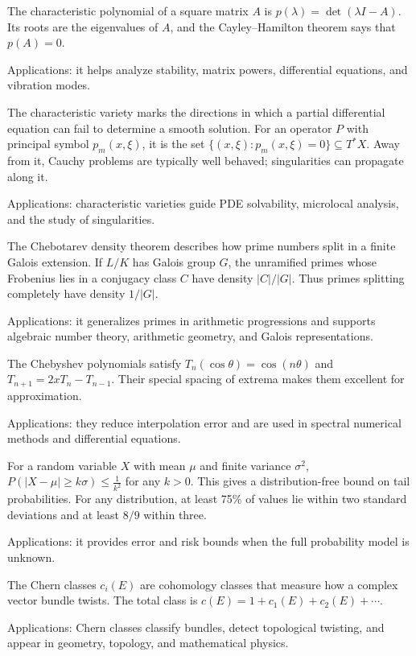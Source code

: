 The characteristic polynomial of a square matrix $A$ is $p(\lambda)=\det(\lambda I-A)$. Its roots are the eigenvalues of $A$, and the Cayley--Hamilton theorem says that $p(A)=0$. \par\noindent Applications: it helps analyze stability, matrix powers, differential equations, and vibration modes.

The characteristic variety marks the directions in which a partial differential equation can fail to determine a smooth solution. For an operator $P$ with principal symbol $p_m(x,\xi)$, it is the set $\{(x,\xi):p_m(x,\xi)=0\}\subseteq T^*X$. Away from it, Cauchy problems are typically well behaved; singularities can propagate along it. \par\noindent Applications: characteristic varieties guide PDE solvability, microlocal analysis, and the study of singularities.

The Chebotarev density theorem describes how prime numbers split in a finite Galois extension. If $L/K$ has Galois group $G$, the unramified primes whose Frobenius lies in a conjugacy class $C$ have density $|C|/|G|$. Thus primes splitting completely have density $1/|G|$. \par\noindent Applications: it generalizes primes in arithmetic progressions and supports algebraic number theory, arithmetic geometry, and Galois representations.

The Chebyshev polynomials satisfy $T_n(\cos\theta)=\cos(n\theta)$ and $T_{n+1}=2xT_n-T_{n-1}$. Their special spacing of extrema makes them excellent for approximation. \par\noindent Applications: they reduce interpolation error and are used in spectral numerical methods and differential equations.

For a random variable $X$ with mean $\mu$ and finite variance $\sigma^2$, $P(|X - \mu| \geq k\sigma) \leq \frac{1}{k^2}$ for any $k>0$. This gives a distribution-free bound on tail probabilities. For any distribution, at least 75\% of values lie within two standard deviations and at least $8/9$ within three. \par\noindent Applications: it provides error and risk bounds when the full probability model is unknown.

The Chern classes $c_i(E)$ are cohomology classes that measure how a complex vector bundle twists. The total class is $c(E)=1+c_1(E)+c_2(E)+\cdots$. \par\noindent Applications: Chern classes classify bundles, detect topological twisting, and appear in geometry, topology, and mathematical physics.

